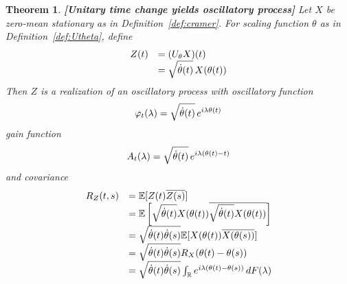 \documentclass{article}
\newcommand{\tmstrong}[1]{\textbf{#1}}
\newtheorem{theorem}{Theorem}
\begin{document}
\begin{theorem}
  {\tmstrong{[Unitary time change yields oscillatory
  process]\label{thm:Utheta_to_osc}}} Let $X$ be zero-mean stationary as in
  Definition~\ref{def:cramer}. For scaling function $\theta$ as in
  Definition~\ref{def:Utheta}, define
  \begin{equation}
    \begin{array}{ll}
      Z (t) & = (U_{\theta} X) (t)\\
      & = \sqrt{\dot{\theta} (t)}  \hspace{0.17em} X (\theta (t))
    \end{array}
  \end{equation}
  Then $Z$ is a realization of an oscillatory process with oscillatory
  function
  \begin{equation}
    \varphi_t (\lambda) = \sqrt{\dot{\theta} (t)}  \hspace{0.17em} e^{i
    \lambda \theta (t)}
  \end{equation}
  gain function
  \begin{equation}
    A_t (\lambda) = \sqrt{\dot{\theta} (t)}  \hspace{0.17em} e^{i \lambda
    (\theta (t) - t)}
  \end{equation}
  and covariance
  \begin{equation}
    \begin{array}{ll}
      R_Z (t, s) & =\mathbb{E} [Z (t) \overline{Z (s)}]\\
      & =\mathbb{E} \left[ \sqrt{\dot{\theta} (t)} X (\theta (t))
      \overline{\sqrt{\dot{\theta} (t)} X (\theta (t))} \right]\\
      & = \sqrt{\dot{\theta} (t)  \dot{\theta} (s)} \mathbb{E} [X (\theta
      (t)) \overline{X (\theta (s))}]\\
      & = \sqrt{\dot{\theta} (t)  \dot{\theta} (s)} R_X  (\theta (t) - \theta
      (s))\\
      & = \sqrt{\dot{\theta} (t)  \dot{\theta} (s)}  \int_{\mathbb{R}} e^{i
      \lambda (\theta (t) - \theta (s))}  \hspace{0.17em} dF (\lambda)
    \end{array} \label{covar}
  \end{equation}
\end{theorem}
\end{document}
